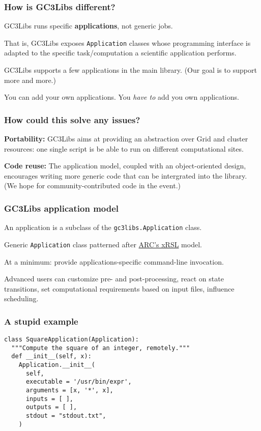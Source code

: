 \documentclass[presentation]{beamer}
\begin{document}
\begin{frame}
\frametitle{How is GC3Libs different?}
\label{sec-5}

  GC3Libs runs specific \textbf{applications}, not generic jobs.

  That is, GC3Libs exposes \texttt{Application} classes whose programming
  interface is adapted to the specific task/computation a scientific
  application performs.

  GC3Libs supports a few applications in the main library.  (Our goal
  is to support more and more.)

  You can add your own applications.  You \emph{have to} add you own
  applications. 
\end{frame}
\begin{frame}
\frametitle{How could this solve any issues?}
\label{sec-6}

  \textbf{Portability:} GC3Libs aims at providing an abstraction over Grid
  and cluster resources: one single script is be able to run 
  on different computational sites.

  \textbf{Code reuse:} The application model, coupled with an object-oriented
  design, encourages writing more generic code that can be intergrated
  into the library.  (We hope for community-contributed code in the
  event.)
\end{frame}
\begin{frame}
\frametitle{GC3Libs application model}
\label{sec-7}

  An application is a subclass of the \texttt{gc3libs.Application} class.

  Generic \texttt{Application} class patterned after \href{http://www.nordugrid.org/documents/xrsl.pdf}{ARC's xRSL} model.

  At a minimum: provide applications-specific command-line invocation.

  Advanced users can customize pre- and post-processing, react on
  state transitions, set computational requirements based on input
  files, influence scheduling.
\end{frame}
\begin{frame}[fragile]
\frametitle{A stupid example}
\label{sec-8}

\begin{verbatim}
class SquareApplication(Application):
  """Compute the square of an integer, remotely."""
  def __init__(self, x):
    Application.__init__(
      self,
      executable = '/usr/bin/expr',
      arguments = [x, '*', x],
      inputs = [ ],
      outputs = [ ],
      stdout = "stdout.txt",
    )
\end{verbatim}
\end{frame}
\end{document}

